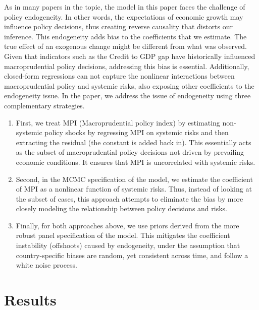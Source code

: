 \documentclass[12pt,a4paper]{article}
\begin{document}
As in many papers in the topic, the model in this paper faces the challenge of policy endogeneity. In other words, the expectations of economic growth may influence policy decisions, thus creating reverse causality that distorts our inference. This endogeneity adds bias to the coefficients that we estimate. The true effect of an exogenous change might be different from what was observed. Given that indicators such as the Credit to GDP gap have historically influenced macroprudential policy decisions, addressing this bias is essential. Additionally, closed-form regressions can not capture the nonlinear interactions between macroprudential policy and systemic risks, also exposing other coefficients to the endogeneity issue.
In the paper, we address the issue of endogeneity using three complementary strategies.
\begin{enumerate}
    \item First, we treat MPI (Macroprudential policy index) by estimating non-systemic policy shocks by regressing MPI on systemic risks and then extracting the residual (the constant is added back in). This essentially acts as the subset of macroprudential policy decisions not driven by prevailing economic conditions. It ensures that MPI is uncorrelated with systemic risks.
    \item Second, in the MCMC specification of the model, we estimate the coefficient of MPI as a nonlinear function of systemic risks. Thus, instead of looking at the subset of cases, this approach attempts to eliminate the bias by more closely modeling the relationship between policy decisions and risks. 
    \item Finally, for both approaches above, we use priors derived from the more robust panel specification of the model. This mitigates the coefficient instability (offshoots) caused by endogeneity, under the assumption that country-specific biases are random, yet consistent across time, and follow a white noise process.
\end{enumerate}




\section{Results}
\end{document}
